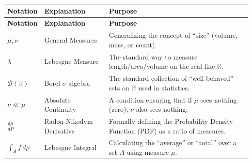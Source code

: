 \begin{longtable}{ | L{0.15\textwidth} | L{0.45\textwidth} | L{0.25\textwidth} | }
    \hline
    \textbf{Notation} & \textbf{Explanation} & \textbf{Purpose} \\
    \hline
    \endfirsthead

    \hline
    \textbf{Notation} & \textbf{Explanation} & \textbf{Purpose} \\
    \hline
    \endhead

    \hline
    \endfoot

    \hline
    \endlastfoot

    $\mu, \nu$ 
    & General Measures 
    & Generalizing the concept of ``size'' (volume, mass, or count). \\ \hline

    $\lambda$ 
    & Lebesgue Measure 
    & The standard way to measure length/area/volume on the real line $\mathbb{R}$. \\ \hline

    $\mathcal{B}(\mathbb{R})$ 
    & Borel $\sigma$-algebra 
    & The standard collection of ``well-behaved'' sets on $\mathbb{R}$ used in statistics. \\ \hline

    $\nu \ll \mu$ 
    & Absolute Continuity 
    & A condition ensuring that if $\mu$ sees nothing (zero), $\nu$ also sees nothing. \\ \hline

    $\frac{d\mu}{dP}$ 
    & Radon-Nikodym Derivative 
    & Formally defining the Probability Density Function (PDF) as a ratio of measures. \\ \hline

    $\int_A f \, d\mu$ 
    & Lebesgue Integral 
    & Calculating the ``average'' or ``total'' over a set $A$ using measure $\mu$. \\ \hline

\end{longtable}